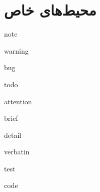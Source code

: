 
\section{محیط‌های خاص}


note

warning

bug

todo

attention

brief

detail

verbatin

test

code

